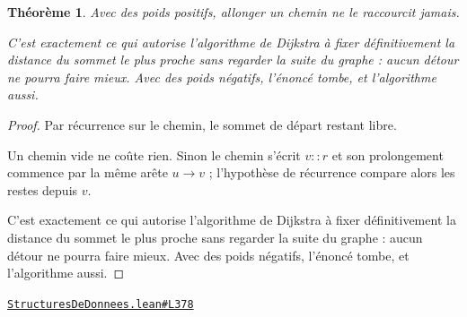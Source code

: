 \documentclass[11pt,a4paper]{article}
\theoremstyle{definition}
\theoremstyle{plain}
\newtheorem{theoreme}{Théorème}
\newcommand{\source}[2]{\par\smallskip\noindent\hfill{\footnotesize\href{#1}{\texttt{#2}}}\par\smallskip}
\begin{document}
\begin{theoreme}
Avec des poids positifs, allonger un chemin ne le raccourcit jamais.

C'est exactement ce qui autorise l'algorithme de Dijkstra à fixer définitivement la
distance du sommet le plus proche sans regarder la suite du graphe : aucun détour ne
pourra faire mieux. Avec des poids négatifs, l'énoncé tombe, et l'algorithme aussi.
\end{theoreme}
\begin{proof}
Par récurrence sur le chemin, le sommet de départ restant libre.

Un chemin vide ne coûte rien. Sinon le chemin s'écrit \(v :: r\) et son prolongement
commence par la même arête \(u \to v\) ; l'hypothèse de récurrence compare alors les
restes depuis \(v\).

C'est exactement ce qui autorise l'algorithme de Dijkstra à fixer définitivement la
distance du sommet le plus proche sans regarder la suite du graphe : aucun détour ne
pourra faire mieux. Avec des poids négatifs, l'énoncé tombe, et l'algorithme aussi.
\end{proof}
\source{https://github.com/Commutator-IO/learn-lean/blob/main/courses/02-lycee/11-informatique-nsi/StructuresDeDonnees.lean\#L378}{StructuresDeDonnees.lean\#L378}
\end{document}
